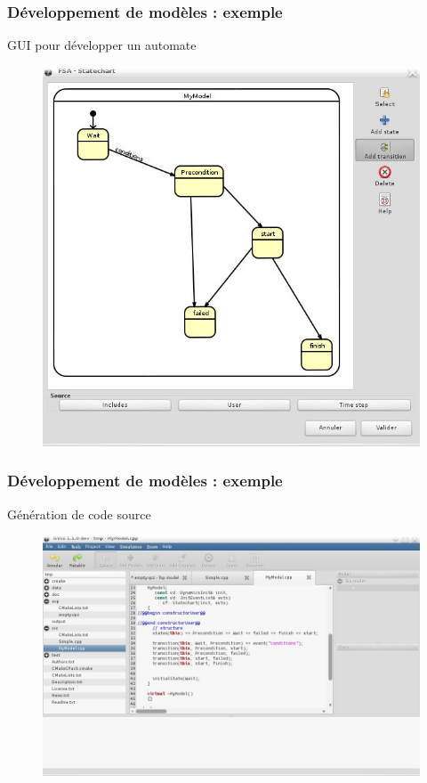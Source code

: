 \documentclass[xetex, compress, table, dvipsnames]{beamer}
\begin{document}
\begin{frame}
  \frametitle{Développement de modèles : exemple}
  \begin{exampleblock}{GUI pour développer un automate}
    \begin{figure}[htpb]
      \centering
      \includegraphics[width=.6\textwidth]{fsa}
    \end{figure}
  \end{exampleblock}
\end{frame}

\begin{frame}
  \frametitle{Développement de modèles : exemple}
  \begin{exampleblock}{Génération de code source}
    \begin{figure}[htpb]
      \centering
      \includegraphics[width=.95\textwidth]{fsa2}
    \end{figure}
  \end{exampleblock}
\end{frame}
\end{document}
